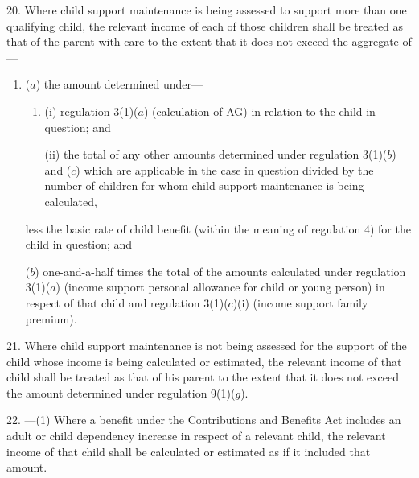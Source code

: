 \documentclass[12pt,a4paper]{article}
\begin{document}
20.  Where child support maintenance is being assessed to support more than one qualifying child, the relevant income of each of those children shall be treated as that of the parent with care to the extent that it does not exceed the aggregate of—
\begin{enumerate}\item[]
($a$) the amount determined under—
\begin{enumerate}\item[]
(i) regulation 3(1)($a$) (calculation of AG) in relation to the child in question; and

(ii) the total of any other amounts determined under regulation 3(1)($b$) 
and ($c$)  %
which are applicable in the case in question divided by the number of children for whom child support maintenance is being calculated,
\end{enumerate}
less the basic rate of child benefit (within the meaning of regulation 4) for the child in question; and

($b$) 
one-and-a-half times  %
the total of the amounts calculated under regulation 3(1)($a$) (income support personal allowance for child or young person) in respect of that child and regulation 
3(1)($c$)(i)  %
(income support family premium).
\end{enumerate}


\medskip

21.  Where child support maintenance is not being assessed for the support of the child whose income is being calculated or estimated, the relevant income of that child shall be treated as that of his parent to the extent that it does not exceed the amount determined under regulation 9(1)($g$).

\medskip

22.%
---(1)  %
  Where a benefit under the Contributions and Benefits Act includes an adult or child dependency increase in respect of a relevant child, the relevant income of that child shall be calculated or estimated as if it included that amount.
\end{document}
